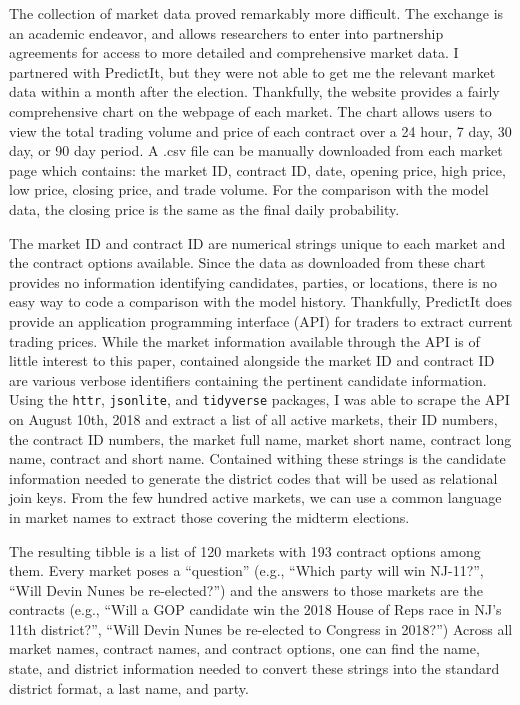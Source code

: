 \documentclass[]{article}
\begin{document}
The collection of market data proved remarkably more difficult. The
exchange is an academic endeavor, and allows researchers to enter into
partnership agreements for access to more detailed and comprehensive
market data. I partnered with PredictIt, but they were not able to get
me the relevant market data within a month after the election.
Thankfully, the website provides a fairly comprehensive chart on the
webpage of each market. The chart allows users to view the total trading
volume and price of each contract over a 24 hour, 7 day, 30 day, or 90
day period. A .csv file can be manually downloaded from each market page
which contains: the market ID, contract ID, date, opening price, high
price, low price, closing price, and trade volume. For the comparison
with the model data, the closing price is the same as the final daily
probability.

The market ID and contract ID are numerical strings unique to each
market and the contract options available. Since the data as downloaded
from these chart provides no information identifying candidates,
parties, or locations, there is no easy way to code a comparison with
the model history. Thankfully, PredictIt does provide an application
programming interface (API) for traders to extract current trading
prices. While the market information available through the API is of
little interest to this paper, contained alongside the market ID and
contract ID are various verbose identifiers containing the pertinent
candidate information. Using the \texttt{httr}, \texttt{jsonlite}, and
\texttt{tidyverse} packages, I was able to scrape the API on August
10th, 2018 and extract a list of all active markets, their ID numbers,
the contract ID numbers, the market full name, market short name,
contract long name, contract and short name. Contained withing these
strings is the candidate information needed to generate the district
codes that will be used as relational join keys. From the few hundred
active markets, we can use a common language in market names to extract
those covering the midterm elections.

The resulting tibble is a list of 120 markets with 193 contract options
among them. Every market poses a ``question'' (e.g., ``Which party will
win NJ-11?'', ``Will Devin Nunes be re-elected?'') and the answers to
those markets are the contracts (e.g., ``Will a GOP candidate win the
2018 House of Reps race in NJ's 11th district?'', ``Will Devin Nunes be
re-elected to Congress in 2018?'') Across all market names, contract
names, and contract options, one can find the name, state, and district
information needed to convert these strings into the standard district
format, a last name, and party.
\end{document}
